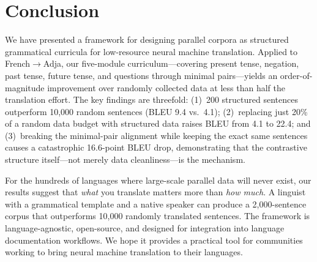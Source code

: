 \documentclass[11pt]{article}
\begin{document}
\section{Conclusion}
\label{sec:conclusion}

We have presented a framework for designing parallel corpora as structured grammatical curricula for low-resource neural machine translation. Applied to French$\rightarrow$Adja, our five-module curriculum---covering present tense, negation, past tense, future tense, and questions through minimal pairs---yields an order-of-magnitude improvement over randomly collected data at less than half the translation effort. The key findings are threefold: (1)~200 structured sentences outperform 10,000 random sentences (BLEU 9.4 vs.\ 4.1); (2)~replacing just 20\% of a random data budget with structured data raises BLEU from 4.1 to 22.4; and (3)~breaking the minimal-pair alignment while keeping the exact same sentences causes a catastrophic 16.6-point BLEU drop, demonstrating that the contrastive structure itself---not merely data cleanliness---is the mechanism.

For the hundreds of languages where large-scale parallel data will never exist, our results suggest that \emph{what} you translate matters more than \emph{how much}. A linguist with a grammatical template and a native speaker can produce a 2,000-sentence corpus that outperforms 10,000 randomly translated sentences. The framework is language-agnostic, open-source, and designed for integration into language documentation workflows. We hope it provides a practical tool for communities working to bring neural machine translation to their languages.




% 
\end{document}
